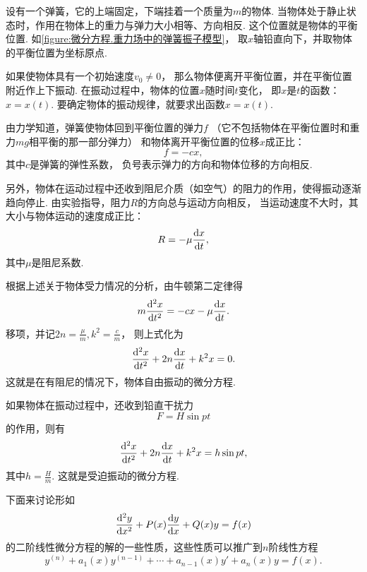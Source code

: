 \begin{example}
设有一个弹簧，它的上端固定，下端挂着一个质量为\(m\)的物体.
当物体处于静止状态时，作用在物体上的重力与弹力大小相等、方向相反.
这个位置就是物体的平衡位置.
如\cref{figure:微分方程.重力场中的弹簧振子模型}，
取\(x\)轴铅直向下，并取物体的平衡位置为坐标原点.

如果使物体具有一个初始速度\(v_0\neq0\)，
那么物体便离开平衡位置，并在平衡位置附近作上下振动.
在振动过程中，物体的位置\(x\)随时间\(t\)变化，
即\(x\)是\(t\)的函数：\(x=x(t)\).
要确定物体的振动规律，就要求出函数\(x=x(t)\).

由力学知道，弹簧使物体回到平衡位置的弹力\(f\)
（它不包括物体在平衡位置时和重力\(mg\)相平衡的那一部分弹力）
和物体离开平衡位置的位移\(x\)成正比：\begin{equation*}
	f = -cx,
\end{equation*}
其中\(c\)是弹簧的弹性系数，
负号表示弹力的方向和物体位移的方向相反.

另外，物体在运动过程中还收到阻尼介质（如空气）的阻力的作用，使得振动逐渐趋向停止.
由实验指导，阻力\(R\)的方向总与运动方向相反，
当运动速度不大时，其大小与物体运动的速度成正比：\begin{equation*}
	R = -\mu \dv{x}{t},
\end{equation*}
其中\(\mu\)是阻尼系数.

根据上述关于物体受力情况的分析，由牛顿第二定律得\begin{equation*}
	m \dv[2]{x}{t} = -cx -\mu \dv{x}{t}.
\end{equation*}
移项，并记\(2n=\frac{\mu}{m},
k^2=\frac{c}{m}\)，
则上式化为\begin{equation*}
	\dv[2]{x}{t}+2n\dv{x}{t}+k^2x=0.
\end{equation*}
这就是在有阻尼的情况下，物体自由振动的微分方程.

如果物体在振动过程中，还收到铅直干扰力\begin{equation*}
	F = H \sin pt
\end{equation*}的作用，则有\begin{equation*}
	\dv[2]{x}{t} + 2n \dv{x}{t} + k^2x = h \sin pt,
\end{equation*}
其中\(h=\frac{H}{m}\).
这就是受迫振动的微分方程.
\end{example}

下面来讨论形如
\begin{equation}\label{equation:微分方程.二阶非齐次线性微分方程的一般形式}
	\dv[2]{y}{x} + P(x) \dv{y}{x} + Q(x) y = f(x)
\end{equation}
的二阶线性微分方程的解的一些性质，这些性质可以推广到\(n\)阶线性方程
\begin{equation}\label{equation:微分方程.n阶线性微分方程的一般形式}
	y^{(n)} + a_1(x) y^{(n-1)} + \dotsb + a_{n-1}(x) y' + a_n(x) y = f(x).
\end{equation}

